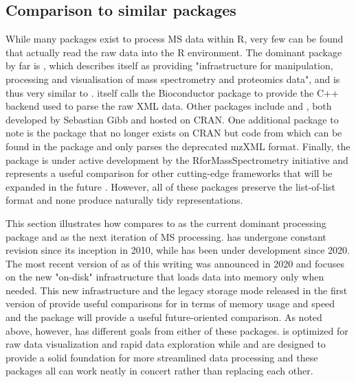 \subsection{Comparison to similar packages}

While many packages exist to process MS data within R, very few can be found that actually read the raw data into the R environment. The dominant package by far is , which describes itself as providing "infrastructure for manipulation, processing and visualisation of mass spectrometry and proteomics data", and is thus very similar to .  itself calls the Bioconductor package  to provide the C++ backend used to parse the raw XML data. Other packages include  and , both developed by Sebastian Gibb and hosted on CRAN. One additional package to note is the  package that no longer exists on CRAN but code from which can be found in the  package and only parses the deprecated mzXML format. Finally, the  package is under active development by the RforMassSpectrometry initiative and represents a useful comparison for other cutting-edge frameworks that will be expanded in the future \citep{rainer2022}. However, all of these packages preserve the list-of-list format and none produce naturally tidy representations.

This section illustrates how  compares to  as the current dominant processing package and  as the next iteration of MS processing.  has undergone constant revision since its inception in 2010, while  has been under development since 2020. The most recent version of  as of this writing was announced in 2020 and focuses on the new "on-disk" infrastructure that loads data into memory only when needed. This new infrastructure and the legacy storage mode released in the first version of  provide useful comparisons for  in terms of memory usage and speed and the  package will provide a useful future-oriented comparison. As noted above, however,  has different goals from either of these packages.  is optimized for raw data visualization and rapid data exploration while  and  are designed to provide a solid foundation for more streamlined data processing and these packages all can work neatly in concert rather than replacing each other. 

